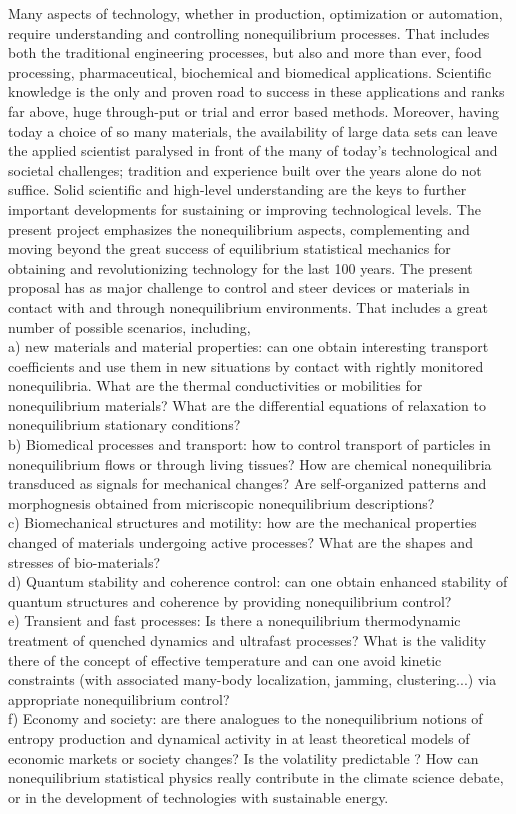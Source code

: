 Many aspects of technology, whether in production, optimization or automation, require understanding and controlling nonequilibrium processes.  That includes both the traditional engineering processes, but also and more than ever, food processing, pharmaceutical, biochemical and biomedical applications.  Scientific knowledge is the only and proven road to success in these applications and ranks far above, huge through-put or trial and error based methods.  Moreover, having today a choice of so many materials, the availability of large data sets can leave the applied scientist paralysed in front of the many of today's technological and societal challenges; tradition and experience built over the years alone do not suffice.  Solid scientific and high-level understanding are the keys to further important developments for sustaining or improving technological levels.  The present project emphasizes the nonequilibrium aspects, complementing and moving beyond the great success of equilibrium statistical mechanics for obtaining and revolutionizing technology for the last 100 years.
The present proposal has as major challenge to control and steer devices or materials in contact with and through nonequilibrium environments.  That includes a great number of possible scenarios, including,\\
a) new materials and material properties:  can one obtain interesting transport coefficients and use them in new situations by contact with rightly monitored nonequilibria.  What are the thermal conductivities or mobilities for nonequilibrium materials?  What are the differential equations of relaxation to nonequilibrium stationary conditions?\\
b) Biomedical processes and transport: how to control transport of particles in nonequilibrium flows or through living tissues?  How are chemical nonequilibria transduced as signals for mechanical changes? Are self-organized patterns and morphognesis obtained from micriscopic nonequilibrium descriptions?\\
c) Biomechanical structures and motility: how are the mechanical properties changed of materials undergoing active processes?  What are the shapes and stresses of bio-materials?\\
d) Quantum stability and coherence control: can one obtain enhanced stability of quantum structures and coherence by providing nonequilibrium control?\\
e) Transient and fast processes: Is there a nonequilibrium thermodynamic treatment of quenched dynamics and ultrafast processes?  What is the validity there of the concept of effective temperature and can one avoid kinetic constraints (with associated many-body localization, jamming, clustering...) via appropriate nonequilibrium control?\\
f) Economy and society: are there analogues to the nonequilibrium notions of entropy production and dynamical activity in at least theoretical models of economic markets or society changes?  Is the volatility predictable ?  How can nonequilibrium statistical physics really contribute in the climate science debate, or in the development of technologies with  sustainable energy.\\

